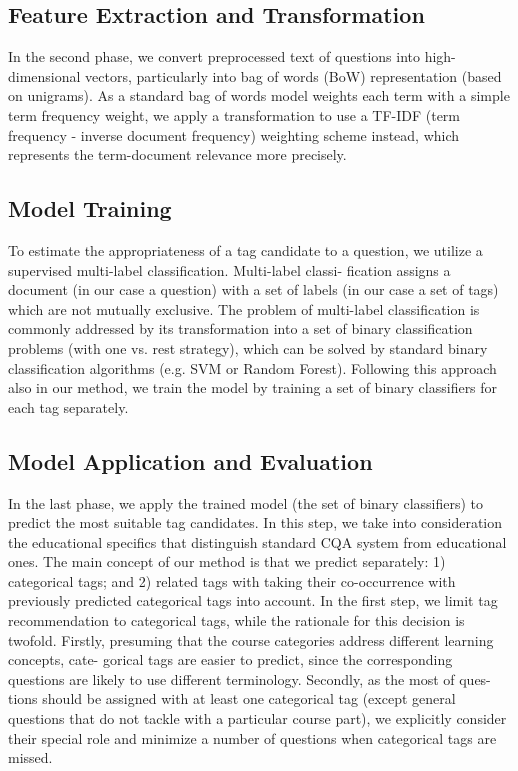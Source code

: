 \documentclass{sig-alternate}
\begin{document}
\subsection{Feature Extraction and Transformation
}In the second phase, we convert preprocessed text of questions into
high-dimensional vectors, particularly into bag of words (BoW)
representation (based on unigrams). As a standard bag of words
model weights each term with a simple term frequency weight, we
apply a transformation to use a TF-IDF (term frequency - inverse
document frequency) weighting scheme instead, which represents
the term-document relevance more precisely.

\subsection{Model Training
}To estimate the appropriateness of a tag candidate to a question,
we utilize a supervised multi-label classification. Multi-label classi-
fication assigns a document (in our case a question) with a set of
labels (in our case a set of tags) which are not mutually exclusive.
The problem of multi-label classification is commonly addressed
by its transformation into a set of binary classification problems
(with one vs. rest strategy), which can be solved by standard binary
classification algorithms (e.g. SVM or Random Forest). Following
this approach also in our method, we train the model by training a
set of binary classifiers for each tag separately.

\subsection{Model Application and Evaluation
}In the last phase, we apply the trained model (the set of binary
classifiers) to predict the most suitable tag candidates. In this step,
we take into consideration the educational specifics that distinguish
standard CQA system from educational ones.
The main concept of our method is that we predict separately: 1)
categorical tags; and 2) related tags with taking their co-occurrence
with previously predicted categorical tags into account.
In the first step, we limit tag recommendation to categorical tags,
while the rationale for this decision is twofold. Firstly, presuming
that the course categories address different learning concepts, cate-
gorical tags are easier to predict, since the corresponding questions
are likely to use different terminology. Secondly, as the most of ques-
tions should be assigned with at least one categorical tag (except
general questions that do not tackle with a particular course part),
we explicitly consider their special role and minimize a number of
questions when categorical tags are missed.
\end{document}
